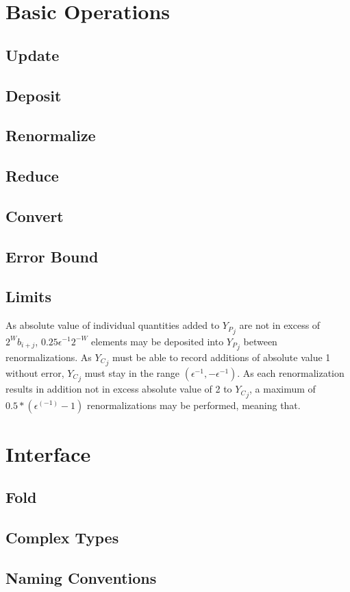 \documentclass[12pt]{article}
\theoremstyle{plain}
\begin{document}
\section{Basic Operations}
  \subsection{Update}
  \subsection{Deposit}
  \subsection{Renormalize}
  \subsection{Reduce}
  \subsection{Convert}
  \subsection{Error Bound}
  \subsection{Limits}
    \label{sec:limits}
    As absolute value of individual quantities added to ${Y_P}_j$ are not in excess of $2^W b_{i + j}$, $0.25\epsilon^{-1}2^{-W}$ elements may be deposited into ${Y_P}_j$ between renormalizations. As ${Y_C}_j$ must be able to record additions of absolute value 1 without error, ${Y_C}_j$ must stay in the range $(\epsilon^{-1}, -\epsilon^{-1})$. As each renormalization results in addition not in excess absolute value of 2 to ${Y_C}_j$, a maximum of $0.5 * (\epsilon^(-1) - 1)$ renormalizations may be performed, meaning that.
\section{Interface}
  \subsection{Fold}
  \subsection{Complex Types}
  \subsection{Naming Conventions}
\end{document}
